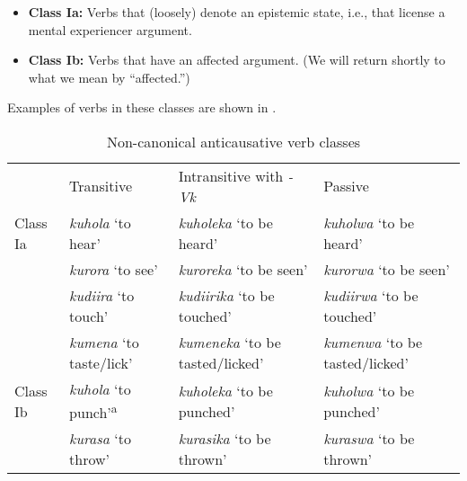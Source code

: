 \documentclass[output=paper]{langsci/lanmgscibook}
\begin{document}
\begin{itemize}
 \item \textbf{Class Ia:} Verbs that (loosely) denote an epistemic state, i.e., that license a mental experiencer argument.
 \item \textbf{Class Ib:} Verbs that have an affected argument. (We will return shortly to what we mean by “affected.”)

\end{itemize}



Examples of verbs in these classes are shown in .

\begin{table}
\caption{Non-canonical anticausative verb classes}
\label{tab:gluckman:4}

\begin{tabularx}{\textwidth}{lp{2.5cm}XX} & {Transitive} & {Intransitive with} {\textit{-Vk}} & {Passive}\\
\lsptoprule
{Class Ia} & \textit{kuhola} \newline ‘to hear’ & \textit{kuholeka} \newline ‘to be heard’ & \textit{kuholwa} \newline ‘to be heard’\\
& \textit{kurora} \newline ‘to see’ & \textit{kuroreka} \newline ‘to be seen’ & \textit{kurorwa} \newline ‘to be seen’\\
\tablevspace & \textit{kudiira} \newline ‘to touch’ & \textit{kudiirika} \newline ‘to be touched’ & \textit{kudiirwa} \newline ‘to be touched’\\
\tablevspace & \textit{kumena} \newline ‘to taste/lick’ & \textit{kumeneka} \newline ‘to be tasted/licked’ & \textit{kumenwa} \newline ‘to be tasted/licked’\\
\midrule
{Class Ib} & \textit{kuhola} \newline ‘to punch’\textsuperscript{a} & \textit{kuholeka} \newline ‘to be punched’ & \textit{kuholwa} \newline ‘to be punched’\\
& \textit{kurasa} \newline ‘to throw’ & \textit{kurasika} \newline ‘to be thrown’ & \textit{kuraswa} \newline ‘to be thrown’\\

\end{tabularx}
\end{table}
\end{document}
